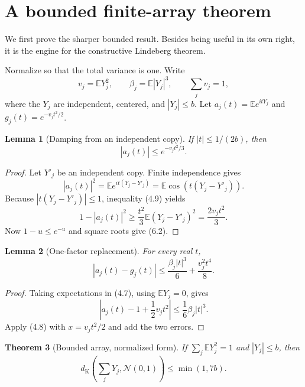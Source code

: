 \documentclass[11pt]{article}
\newtheorem{theorem}{Theorem}[section]
\newtheorem{lemma}[theorem]{Lemma}
\newcommand{\E}{\mathbb E}
\newcommand{\dk}{d_{\mathrm K}}
\newcommand{\abs}[1]{\left|#1\right|}
\begin{document}
\section{A bounded finite-array theorem}\label{sec:bounded}

We first prove the sharper bounded result.  Besides being useful in its own
right, it is the engine for the constructive Lindeberg theorem.

Normalize so that the total variance is one.  Write
\[
 v_j=\E Y_j^2,\qquad \beta_j=\E|Y_j|^3,
 \qquad \sum_jv_j=1,                                  \tag{6.1}
\]
where the \(Y_j\) are independent, centered, and \(|Y_j|\le b\).  Let
\(a_j(t)=\E e^{itY_j}\) and \(g_j(t)=e^{-v_jt^2/2}\).

\begin{lemma}[Damping from an independent copy]\label{lem:bounded-damping}
If \(|t|\le1/(2b)\), then
\[
 |a_j(t)|\le e^{-v_jt^2/3}.                            \tag{6.2}
\]
\end{lemma}

\begin{proof}
Let \(Y'_j\) be an independent copy.  Finite independence gives
\[
 |a_j(t)|^2=\E e^{it(Y_j-Y'_j)}
            =\E\cos(t(Y_j-Y'_j)).                     \tag{6.3}
\]
Because \(|t(Y_j-Y'_j)|\le1\), inequality (4.9) yields
\[
 1-|a_j(t)|^2
 \ge\frac{t^2}{3}\E(Y_j-Y'_j)^2
 =\frac{2v_jt^2}{3}.                                  \tag{6.4}
\]
Now \(1-u\le e^{-u}\) and square roots give (6.2).
\end{proof}

\begin{lemma}[One-factor replacement]\label{lem:one-factor}
For every real \(t\),
\[
 |a_j(t)-g_j(t)|
 \le\frac{\beta_j|t|^3}{6}+\frac{v_j^2t^4}{8}.        \tag{6.5}
\]
\end{lemma}

\begin{proof}
Taking expectations in (4.7), using \(\E Y_j=0\), gives
\[
 \abs{a_j(t)-1+\frac12v_jt^2}
 \le\frac16\beta_j|t|^3.                             \tag{6.6}
\]
Apply (4.8) with \(x=v_jt^2/2\) and add the two errors.
\end{proof}

\begin{theorem}[Bounded array, normalized form]\label{thm:bounded-normalized}
If \(\sum_j\E Y_j^2=1\) and \(|Y_j|\le b\), then
\[
 \dk\!\left(\sum_jY_j,\mathcal N(0,1)\right)
 \le\min(1,7b).                                       \tag{6.7}
\]
\end{theorem}
\end{document}
